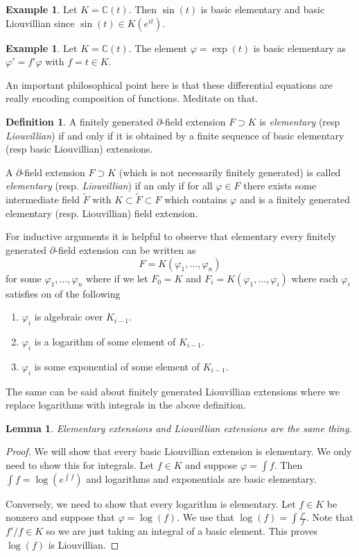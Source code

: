 \documentclass[12pt]{book}
\numberwithin{equation}{section}
\newtheorem{lemma}[theorem]{Lemma}
\theoremstyle{definition}
\newtheorem{definition}[theorem]{Definition}
\newtheorem{example}[theorem]{Example}
\theoremstyle{remark}
\newcommand{\CC}{\mathbb{C}}
\begin{document}
\begin{example}
	Let $K= \CC(t)$. 
	Then $\sin(t)$ is basic elementary and basic Liouvillian since $\sin(t) \in K(e^{it})$.
\end{example}

\begin{example}
	Let $K = \CC(t)$. 
	The element $\varphi = \exp(t)$ is basic elementary as $\varphi'=f'\varphi$ with $f=t \in K$. 
\end{example}

An important philosophical point here is that these differential equations are really encoding composition of functions. 
Meditate on that. 

\begin{definition}
	A finitely generated $\partial$-field extension $F \supset K$ is \emph{elementary} (resp \emph{Liouvillian}) if and only if it is obtained by a finite sequence of basic elementary (resp basic Liouvillian) extensions.
	
	A $\partial$-field extension $F \supset K$ (which is not necessarily finitely generated) is called \emph{elementary} (resp. \emph{Liouvillian}) if an only if for all $\varphi \in F$ there exists some intermediate field $\widetilde{F}$ with $K \subset \widetilde{F} \subset F$ which contains $\varphi$ and is a finitely generated elementary (resp. Liouvillian) field extension. 
\end{definition}
For inductive arguments it is helpful to observe that elementary every finitely generated $\partial$-field extension can be written as 
 $$ F = K(\varphi_1,\ldots,\varphi_n) $$
for some $\varphi_1,\ldots,\varphi_n$ where if we let $F_0 = K$ and $F_i = K(\varphi_1,\ldots,\varphi_i)$ where each $\varphi_i$ satisfies on of the following
\begin{enumerate}
	\item $\varphi_i$ is algebraic over $K_{i-1}$.
	\item $\varphi_i$ is a logarithm of some element of $K_{i-1}$.
	\item $\varphi_i$ is some exponential of some element of $K_{i-1}$.
\end{enumerate} 
The same can be said about finitely generated Liouvillian extensions where we replace logarithms with integrals in the above definition.

\begin{lemma}
	Elementary extensions and Liouvillian extensions are the same thing. 
\end{lemma}
\begin{proof}
	We will show that every basic Liouvillian extension is elementary.
	We only need to show this for integrals. 
	Let $f \in K$ and suppose $\varphi = \int f$.
	Then $\int f = \log( e^{\int f})$ and logarithms and exponentials are basic elementary. 
	
	Conversely, we need to show that every logarithm is elementary. 
	Let $f\in K$ be nonzero and suppose that $\varphi =\log(f)$. 
	We use that $\log(f) = \int \frac{f'}{f}$.
	Note that $f'/f \in K$ so we are just taking an integral of a basic element. 
	This proves $\log(f)$ is Liouvillian.
\end{proof}
\end{document}

